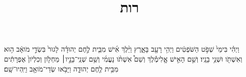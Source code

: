 \documentclass{openreader}
\title{רות}
\date{}
\begin{document}
\maketitle
\raggedbottom 
\fontsize{16pt}{24pt}\selectfont


וַיְהִ֗י בִּימֵי֙ שְׁפֹ֣ט הַשֹּׁפְטִ֔ים וַיְהִ֥י רָעָ֖ב בָּאָ֑רֶץ וַיֵּ֨לֶךְ אִ֜ישׁ מִבֵּ֧ית לֶ֣חֶם יְהוּדָ֗ה לָגוּר֙ בִּשְׂדֵ֣י מֹואָ֔ב ה֥וּא וְאִשְׁתֹּ֖ו וּשְׁנֵ֥י בָנָֽיו׃ 
וְשֵׁ֣ם הָאִ֣ישׁ אֱֽלִימֶ֡לֶךְ וְשֵׁם֩ אִשְׁתֹּ֨ו נָעֳמִ֜י וְשֵׁ֥ם שְׁנֵֽי־בָנָ֣יו׀ מַחְלֹ֤ון וְכִלְיֹון֙ אֶפְרָתִ֔ים מִבֵּ֥ית לֶ֖חֶם יְהוּדָ֑ה וַיָּבֹ֥אוּ שְׂדֵי־מֹואָ֖ב וַיִּֽהְיוּ־שָֽׁם׃ 
\end{document}
